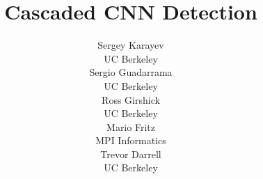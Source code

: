 
\title{Cascaded CNN Detection}

\author{
Sergey Karayev\\ UC Berkeley\\
\And Sergio Guadarrama\\ UC Berkeley\\
\And Ross Girshick\\ UC Berkeley\\
\AND Mario Fritz\\ MPI Informatics\\
\And Trevor Darrell\\ UC Berkeley\\
}

\nipsfinalcopy


\maketitle








\small{

}

